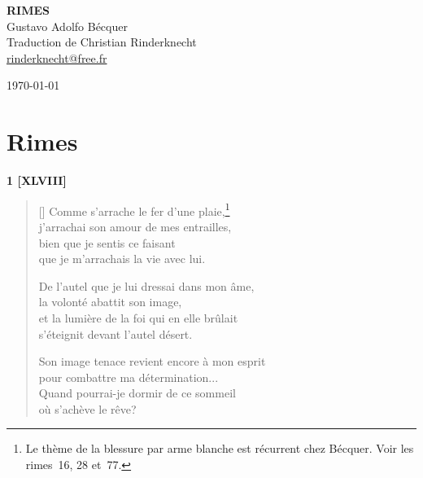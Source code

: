 \documentclass[a4paper,12pt]{book}
\begin{document}
\thispagestyle{empty}
\vspace*{70mm}
\begin{center}
{\Huge\textbf{RIMES}} \\
\vspace*{10mm}
{\Large Gustavo Adolfo Bécquer} \\
\vspace*{10mm}
Traduction de Christian Rinderknecht\\
\url{rinderknecht@free.fr}
\end{center}

\centerline\today

\cleardoublepage

\frenchspacing  %


\chapter{Rimes}


\begin{center}
  \textbf{1 [XLVIII]}
\end{center}

\settowidth{\versewidth}{et la lumière de la foi qui en elle brûlait}

\begin{verse}[\versewidth]
  Comme s'arrache le fer d'une plaie,\footnote{Le thème de la blessure
  par arme blanche est récurrent chez Bécquer. Voir les rimes~16, 28
  et~77.} \\
  j'arrachai son amour de mes entrailles, \\
  bien que je sentis ce faisant \\
  que je m'arrachais la vie avec lui.

  De l'autel que je lui dressai dans mon âme, \\
  la volonté abattit son image, \\
  et la lumière de la foi qui en elle brûlait \\
  s'éteignit devant l'autel désert.

  Son image tenace revient encore à mon esprit \\
  pour combattre ma détermination... \\
  Quand pourrai-je dormir de ce sommeil \\
  où s'achève le rêve?
\end{verse}
\end{document}
